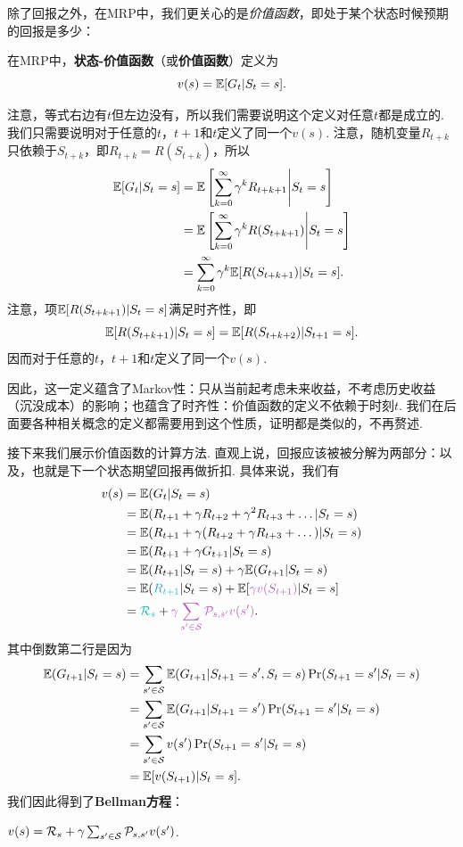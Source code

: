 除了回报之外，在MRP中，我们更关心的是\textit{价值函数}，即处于某个状态时候预期的回报是多少：
\begin{definition}[价值函数]
在MRP中，\textbf{状态-价值函数}（或\textbf{价值函数}）定义为
    \[v(s) = \mathbb{E}[G_t|S_t=s].\]
\end{definition}

注意，等式右边有$t$但左边没有，所以我们需要说明这个定义对任意$t$都是成立的. 我们只需要说明对于任意的$t$，$t+1$和$t$定义了同一个$v(s)$. 注意，随机变量$R_{t+k}$只依赖于$S_{t+k}$，即$R_{t+k}=R(S_{t+k})$，所以
\begin{align*}
    \mathbb{E}[G_t|S_t=s] &= \mathbb{E}\left[\sum_{k=0}^\infty \gamma^k R_{t+k+1}\middle|S_t=s\right] \\
    &= \mathbb{E}\left[\sum_{k=0}^\infty \gamma^k R(S_{t+k+1})\middle|S_t=s\right]\\
    &= \sum_{k=0}^\infty \gamma^k \mathbb{E}[R(S_{t+k+1})|S_t=s].
\end{align*}
注意，项$\mathbb{E}[R(S_{t+k+1})|S_t=s]$满足时齐性，即
\[\mathbb{E}[R(S_{t+k+1})|S_t=s]=\mathbb{E}[R(S_{t+k+2})|S_{t+1}=s].\]
因而对于任意的$t$，$t+1$和$t$定义了同一个$v(s)$.

因此，这一定义蕴含了Markov性：只从当前起考虑未来收益，不考虑历史收益（沉没成本）的影响；也蕴含了时齐性：价值函数的定义不依赖于时刻$t$. 我们在后面要各种相关概念的定义都需要用到这个性质，证明都是类似的，不再赘述.

接下来我们展示价值函数的计算方法. 直观上说，回报应该被被分解为两部分：以及，也就是下一个状态期望回报再做折扣. 具体来说，我们有
\begin{align*}
v(s) &= \E(G_t|S_t=s) \\
    &= \E(R_{t+1}+ \gamma R_{t+2} + \gamma^2 R_{t+3}+\dots | S_t= s) \\
    &= \E(R_{t+1} + \gamma (R_{t+2}+\gamma R_{t+3}+\dots) | S_t = s) \\
    &= \E(R_{t+1} + \gamma G_{t+1} | S_t = s) \\
    &= \E(R_{t+1} | S_t = s) + \gamma \E(G_{t+1} | S_t = s) \\
    &= \E(\contrastlight{R_{t+1}}|S_t=s) + \E[\light{\gamma v(S_{t+1})}|S_t=s]\\
    &= \contrastlight{\mathcal R_s} + \light{\gamma \sum_{s'\in \calS}\calP_{s,s'}v(s')}.
\end{align*}
其中倒数第二行是因为
\begin{align*}
    \mathbb{E}(G_{t+1}|S_t=s) &= \sum_{s'\in \mathcal S}\mathbb{E}(G_{t+1}|S_{t+1}=s',S_t=s)\Pr(S_{t+1}=s'|S_t=s)\\
    &= \sum_{s'\in \mathcal S}\mathbb{E}(G_{t+1}|S_{t+1}=s')\Pr(S_{t+1}=s'|S_t=s)\\
    &= \sum_{s'\in \mathcal S}v(s')\Pr(S_{t+1}=s'|S_t=s)\\
    &=\mathbb{E}[v(S_{t+1})|S_t=s].
\end{align*}
我们因此得到了\textbf{Bellman方程}：
\begin{theorem}[Bellman方程]\label{thm:MRP-Bellman}
    $v(s)=\mathcal R_s + \gamma \sum_{s'\in \mathcal S}\mathcal P_{s,s'}v(s')$.
\end{theorem}

